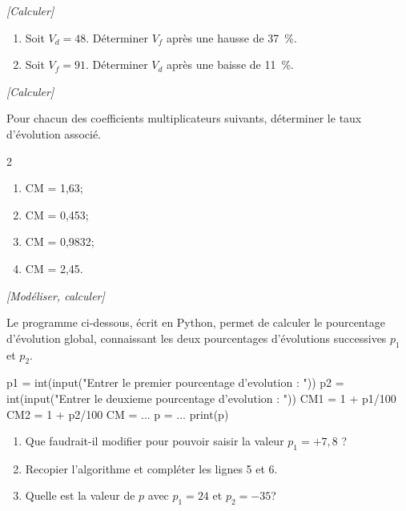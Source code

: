 \exo \textit{[Calculer]}

\begin{enumerate}
\item Soit $V_d=48$. Déterminer $V_f$ après une hausse de 37~\%.
\item Soit $V_f=91$. Déterminer $V_d$ après une baisse de 11~\%.
\end{enumerate}

\exo \textit{[Calculer]}

Pour chacun des coefficients multiplicateurs suivants, déterminer le taux d'évolution associé.

\setlength{\columnseprule}{0pt}
\begin{multicols}{2}
\begin{enumerate}[label=\arabic*.]
\item CM = 1,63; 
\item CM = 0,453;
\item CM = 0,9832;
\item CM = 2,45.
\end{enumerate}
\end{multicols}

\exo \textit{[Modéliser, calculer]}

Le programme ci-dessous, écrit en Python, permet de calculer le pourcentage d'évolution global, connaissant les deux pourcentages d'évolutions successives $p_1$ et $p_2$.

\medskip

\begin{center}
\begin{minipage}{0.78\linewidth}
\begin{pythoncodenumligne}
p1 = int(input("Entrer le premier pourcentage d'evolution : "))
p2 = int(input("Entrer le deuxieme pourcentage d'evolution : "))
CM1 = 1 + p1/100
CM2 = 1 + p2/100
CM = ...
p = ...
print(p)
\end{pythoncodenumligne}
\end{minipage}
\end{center}


\begin{enumerate}
\item Que faudrait-il modifier pour pouvoir saisir la valeur $p_1=+7,8$ ?  
\item Recopier l'algorithme et compléter les lignes 5 et 6.
\item Quelle est la valeur de $p$ avec $p_1=24$ et $p_2=-35$?
\end{enumerate}


